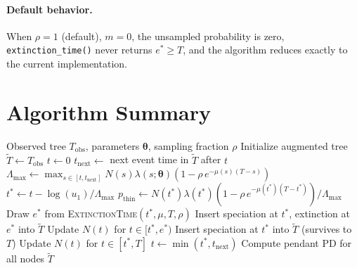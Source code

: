 \documentclass[11pt]{article}
\newcommand{\btheta}{\boldsymbol{\theta}}
\newcommand{\Tobs}{T_{\mathrm{obs}}}
\begin{document}
\paragraph{Default behavior.} When $\rho = 1$ (default), $m = 0$, the unsampled probability is zero, \texttt{extinction\_time()} never returns $e^* \geq T$, and the algorithm reduces exactly to the current implementation.

\section{Algorithm Summary}

\begin{algorithm}[H]
\caption{Tree augmentation with incomplete taxon sampling}
\begin{algorithmic}[1]
\Require Observed tree $\Tobs$, parameters $\btheta$, sampling fraction $\rho$
\State Initialize augmented tree $\tilde{T} \gets \Tobs$
\State $t \gets 0$
  \State $t_{\mathrm{next}} \gets$ next event time in $\tilde{T}$ after $t$
  \State $\Lambda_{\max} \gets \max_{s \in [t, t_{\mathrm{next}}]} N(s) \lambda(s; \btheta) (1 - \rho\, e^{-\mu(s)(T-s)})$
  \State $t^* \gets t - \log(u_1) / \Lambda_{\max}$
    \State $p_{\mathrm{thin}} \gets N(t^*) \lambda(t^*) (1 - \rho\, e^{-\mu(t^*)(T-t^*)}) / \Lambda_{\max}$
     
      \State Draw $e^*$ from \textsc{ExtinctionTime}$(t^*, \mu, T, \rho)$
       
        \State Insert speciation at $t^*$, extinction at $e^*$ into $\tilde{T}$
        \State Update $N(t)$ for $t \in [t^*, e^*)$
      \Else {}
        \State Insert speciation at $t^*$ into $\tilde{T}$ (survives to $T$)
        \State Update $N(t)$ for $t \in [t^*, T]$
      \EndIf
    \EndIf
  \EndIf
  \State $t \gets \min(t^*, t_{\mathrm{next}})$
\EndWhile
\State Compute pendant PD for all nodes
\State \Return $\tilde{T}$
\end{algorithmic}
\end{algorithm}
\end{document}
